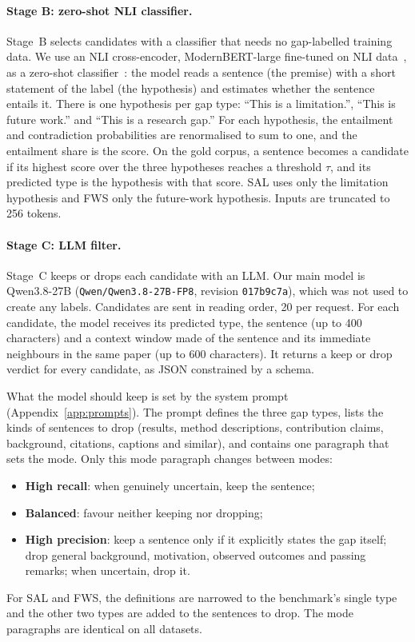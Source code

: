 \paragraph{Stage B: zero-shot NLI classifier.} Stage~B selects candidates with a classifier that needs no gap-labelled training data. We use an NLI cross-encoder, ModernBERT-large fine-tuned on NLI data~\cite{warner2024modernbert,modernbertnli,sileo2024tasksource}, as a zero-shot classifier~\cite{yin2019zeroshot}: the model reads a sentence (the premise) with a short statement of the label (the hypothesis) and estimates whether the sentence entails it. There is one hypothesis per gap type: ``This is a limitation.'', ``This is future work.'' and ``This is a research gap.'' For each hypothesis, the entailment and contradiction probabilities are renormalised to sum to one, and the entailment share is the score. On the gold corpus, a sentence becomes a candidate if its highest score over the three hypotheses reaches a threshold $\tau$, and its predicted type is the hypothesis with that score. SAL uses only the limitation hypothesis and FWS only the future-work hypothesis. Inputs are truncated to 256 tokens.

\paragraph{Stage C: LLM filter.} Stage~C keeps or drops each candidate with an LLM. Our main model is Qwen3.8-27B (\texttt{Qwen/Qwen3.8-27B-FP8}, revision \texttt{017b9c7a}), which was not used to create any labels. Candidates are sent in reading order, 20 per request. For each candidate, the model receives its predicted type, the sentence (up to 400 characters) and a context window made of the sentence and its immediate neighbours in the same paper (up to 600 characters). It returns a keep or drop verdict for every candidate, as JSON constrained by a schema.

What the model should keep is set by the system prompt (Appendix~\ref{app:prompts}). The prompt defines the three gap types, lists the kinds of sentences to drop (results, method descriptions, contribution claims, background, citations, captions and similar), and contains one paragraph that sets the mode. Only this mode paragraph changes between modes:
\begin{itemize}
  \item \textbf{High recall}: when genuinely uncertain, keep the sentence;
  \item \textbf{Balanced}: favour neither keeping nor dropping;
  \item \textbf{High precision}: keep a sentence only if it explicitly states the gap itself; drop general background, motivation, observed outcomes and passing remarks; when uncertain, drop it.
\end{itemize}
For SAL and FWS, the definitions are narrowed to the benchmark's single type and the other two types are added to the sentences to drop. The mode paragraphs are identical on all datasets.

